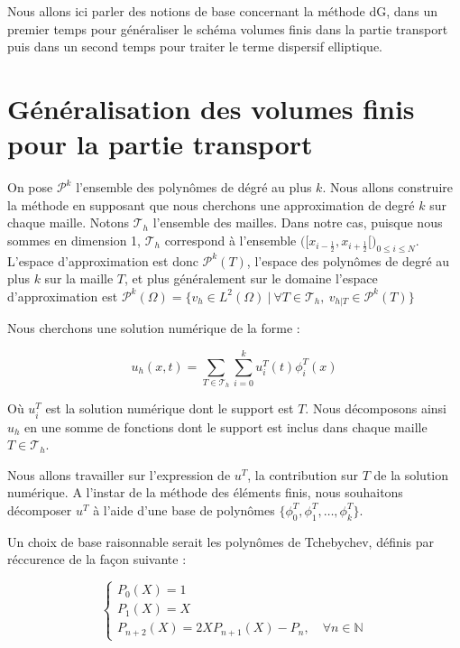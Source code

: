 Nous allons ici parler des notions de base concernant la méthode dG, dans un premier temps pour généraliser le schéma volumes finis dans la partie transport puis dans un second temps pour traiter le terme dispersif elliptique.


\section{Généralisation des volumes finis pour la partie transport}

On pose $\mathcal{P}^k$ l'ensemble des polynômes de dégré au plus $k$. Nous allons construire la méthode en supposant que nous cherchons une approximation de degré $k$ sur chaque maille. 
Notons $\mathcal{T}_h$ l'ensemble des mailles. Dans notre cas, puisque nous sommes en dimension 1, $\mathcal{T}_h$ correspond à l'ensemble $\Big([x_{i-\frac{1}{2} },x_{i+\frac{1}{2}}[\Big)_{ 0 \leq i \leq N}$.
L'espace d'approximation est donc $\mathcal{P}^k(T)$, l'espace des polynômes de degré au plus $k$ sur la maille $T$, et plus généralement sur le domaine l'espace d'approximation est $\mathcal{P}^k(\Omega) = \Big\{ v_h \in L^2(\Omega) \ | \ \forall T \in \mathcal{T}_h, \ v_{h|T} \in \mathcal{P}^k(T) \Big\}$

Nous cherchons une solution numérique de la forme : 

$$ u_h(x,t) = \sum_{T \in \mathcal{T}_h}\sum_{i =0}^{k} u_i^T(t)\phi_i^T(x)$$

Où $u_i^T$ est la solution numérique dont le support est $T$. Nous décomposons ainsi $u_h$ en une somme de fonctions dont le support est inclus dans chaque maille $T \in \mathcal{T}_h$.

Nous allons travailler sur l'expression de $u^T$, la contribution sur $T$ de la solution numérique.
A l'instar de la méthode des éléments finis, nous souhaitons décomposer $u^T$ à l'aide d'une base de polynômes $\big\{ \phi_0^T, \phi_1^T, \dots,\phi_k^T \big\}$.

Un choix de base raisonnable serait les polynômes de Tchebychev, définis par réccurence de la façon suivante :

$$\begin{cases}
    P_0(X) = 1 \\
    P_1(X) = X \\
    P_{n+2}(X) = 2XP_{n+1}(X) - P_n, \quad \forall n\in \mathbb{N}
\end{cases}$$

\vspace{1em}

